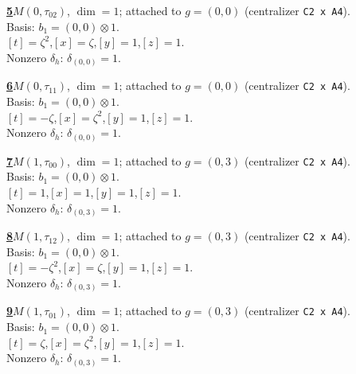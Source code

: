 \begin{samepage}\noindent\textbf{\underline{5}}\quad $M(0,\tau_{02})$, $\dim=1$; attached to $g=(0,0)$ (centralizer \texttt{C2 x A4}).\\
Basis: $b_{1}=(0,0)\otimes 1$.\\
$[t]=\zeta^2$,\quad $[x]=\zeta$,\quad $[y]=1$,\quad $[z]=1$.\\
Nonzero $\delta_h$: $\delta_{(0,0)}=1$.\end{samepage}
\medskip

\begin{samepage}\noindent\textbf{\underline{6}}\quad $M(0,\tau_{11})$, $\dim=1$; attached to $g=(0,0)$ (centralizer \texttt{C2 x A4}).\\
Basis: $b_{1}=(0,0)\otimes 1$.\\
$[t]=-\zeta$,\quad $[x]=\zeta^2$,\quad $[y]=1$,\quad $[z]=1$.\\
Nonzero $\delta_h$: $\delta_{(0,0)}=1$.\end{samepage}
\medskip

\begin{samepage}\noindent\textbf{\underline{7}}\quad $M(1,\tau_{00})$, $\dim=1$; attached to $g=(0,3)$ (centralizer \texttt{C2 x A4}).\\
Basis: $b_{1}=(0,0)\otimes 1$.\\
$[t]=1$,\quad $[x]=1$,\quad $[y]=1$,\quad $[z]=1$.\\
Nonzero $\delta_h$: $\delta_{(0,3)}=1$.\end{samepage}
\medskip

\begin{samepage}\noindent\textbf{\underline{8}}\quad $M(1,\tau_{12})$, $\dim=1$; attached to $g=(0,3)$ (centralizer \texttt{C2 x A4}).\\
Basis: $b_{1}=(0,0)\otimes 1$.\\
$[t]=-\zeta^2$,\quad $[x]=\zeta$,\quad $[y]=1$,\quad $[z]=1$.\\
Nonzero $\delta_h$: $\delta_{(0,3)}=1$.\end{samepage}
\medskip

\begin{samepage}\noindent\textbf{\underline{9}}\quad $M(1,\tau_{01})$, $\dim=1$; attached to $g=(0,3)$ (centralizer \texttt{C2 x A4}).\\
Basis: $b_{1}=(0,0)\otimes 1$.\\
$[t]=\zeta$,\quad $[x]=\zeta^2$,\quad $[y]=1$,\quad $[z]=1$.\\
Nonzero $\delta_h$: $\delta_{(0,3)}=1$.\end{samepage}
\medskip

